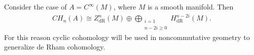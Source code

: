     \begin{example}
        Consider the case of $A=C^\infty(M)$, where $M$ is a smooth manifold. Then
        \begin{gather}
            CH_n(A)\cong Z^n_\text{dR}(M)\oplus\bigoplus_{\substack{i=1\\n-2i\geq0}}H^{n-2i}_\text{dR}(M).
        \end{gather}
        For this reason cyclic cohomology will be used in noncommutative geometry to generalize de Rham cohomology.
    \end{example}